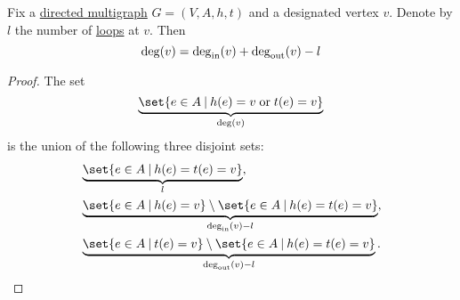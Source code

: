 \begin{proposition}\label{thm:sum_of_graph_degrees}
  Fix a \hyperref[def:directed_multigraph]{directed multigraph} \( G = (V, A, h, t) \) and a designated vertex \( v \). Denote by \( l \) the number of \hyperref[def:directed_multigraph/loop]{loops} at \( v \). Then
  \begin{equation*}
    \deg(v) = \deg_{\operatorname{in}}(v) + \deg_{\operatorname{out}}(v) - l
  \end{equation*}
\end{proposition}
\begin{proof}
  The set
  \begin{equation*}
    \underbrace{ \set{ e \in A \given h(e) = v \T{or} t(e) = v } }_{\deg(v)}
  \end{equation*}
  is the union of the following three disjoint sets:
  \begin{align*}
    &\underbrace{ \set{ e \in A \given h(e) = t(e) = v } }_{l}, \\
    &\underbrace{ \set{ e \in A \given h(e) = v } \setminus \set{ e \in A \given h(e) = t(e) = v } }_{\deg_{\op{in}}(v) - l}, \\
    &\underbrace{ \set{ e \in A \given t(e) = v } \setminus \set{ e \in A \given h(e) = t(e) = v } }_{\deg_{\op{out}}(v) - l}.
  \end{align*}
\end{proof}

